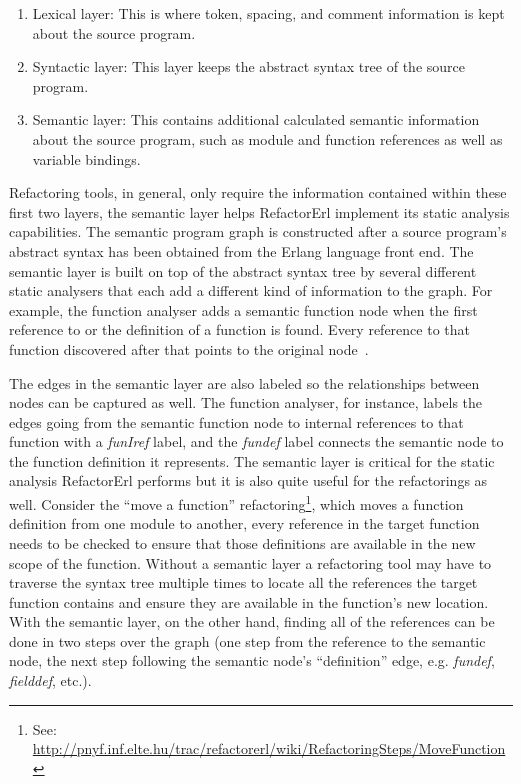 \begin{enumerate}
	\item Lexical layer: This is where token, spacing, and comment information is kept about the source program.
	\item Syntactic layer: This layer keeps the abstract syntax tree of the source program.
	\item Semantic layer: This contains additional calculated semantic information about the source program, such as module and function references as well as variable bindings.
\end{enumerate}

Refactoring tools, in general, only require the information contained within these first two layers, the semantic layer helps RefactorErl implement its static analysis capabilities. The semantic program graph is constructed after a source program's abstract syntax has been obtained from  the Erlang language front end. The semantic layer is built on top of the abstract syntax tree by several different static analysers that each add a different kind of information to the graph. For example, the function analyser adds a semantic function node when the first reference to or the definition of a function is found. Every reference to that function discovered after that points to the original node~\citep{erlangStatic}. 

The edges in the semantic layer are also labeled so the relationships between nodes can be captured as well. The function analyser, for instance, labels the edges going from the semantic function node to internal references to that function with a \textit{funIref} label, and the \textit{fundef} label connects the semantic node to the function definition it represents. The semantic layer is critical for the static analysis RefactorErl performs but it is also quite useful for the refactorings as well. Consider the ``move a function'' refactoring\footnote{See: \url{http://pnyf.inf.elte.hu/trac/refactorerl/wiki/RefactoringSteps/MoveFunction}}, which moves a function definition from one module to another, every reference in the target function needs to be checked to ensure that those definitions are available in the new scope of the function. Without a semantic layer a refactoring tool may have to traverse the syntax tree multiple times to locate all the references the target function contains and ensure they are available in the function's new location. With the semantic layer, on the other hand, finding all of the references can be done in two steps over the graph (one step from the reference to the semantic node, the next step following the semantic node's ``definition'' edge, e.g. \textit{fundef}, \textit{fielddef}, etc.).

